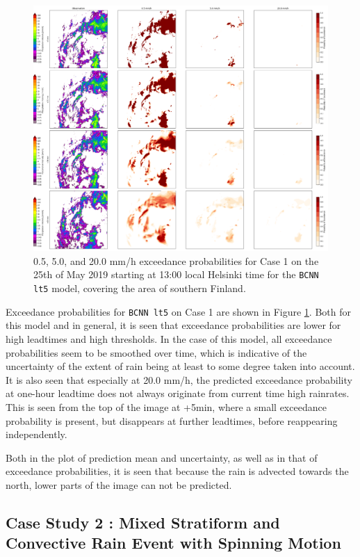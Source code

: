 \begin{figure}[H]
	\centering
	\includegraphics[width=\textwidth]{images/cases/bcnn_prob_case1}
	\caption{0.5, 5.0, and 20.0 mm/h exceedance probabilities for Case 1 on the 25th of May 2019 starting at 13:00 local Helsinki time for the \texttt{BCNN lt5} model, covering the area of southern Finland.}
	\label{fig:bcnn_prob_case1}
\end{figure}

Exceedance probabilities for \texttt{BCNN lt5} on Case 1 are shown in Figure \ref{fig:bcnn_prob_case1}. Both for this model and in general, it is seen that exceedance probabilities are lower for high leadtimes and high thresholds. In the case of this model, all exceedance probabilities seem to be smoothed over time, which is indicative of the uncertainty of the extent of rain being at least to some degree taken into account. It is also seen that especially at 20.0 mm/h, the predicted exceedance probability at one-hour leadtime does not always originate from current time high rainrates. This is seen from the top of the image at +5min, where a small exceedance probability is present, but disappears at further leadtimes, before reappearing independently. 



Both in the plot of prediction mean and uncertainty, as well as in that of exceedance probabilities, it is seen that because the rain is advected towards the north, lower parts of the image can not be predicted. 

\subsection{Case Study 2 : Mixed Stratiform and Convective Rain Event with Spinning Motion}

